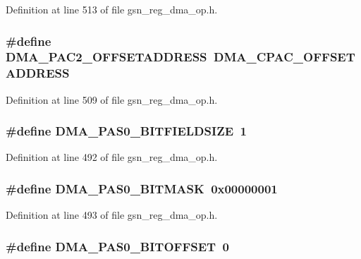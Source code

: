 Definition at line 513 of file gsn\_\-reg\_\-dma\_\-op.h.

\hypertarget{a00547_a59f4ab931db8721c4394452c101c96ca}{
\subsubsection[{DMA\_\-PAC2\_\-OFFSETADDRESS}]{\setlength{\rightskip}{0pt plus 5cm}\#define DMA\_\-PAC2\_\-OFFSETADDRESS~DMA\_\-CPAC\_\-OFFSETADDRESS}}
\label{a00547_a59f4ab931db8721c4394452c101c96ca}


Definition at line 509 of file gsn\_\-reg\_\-dma\_\-op.h.

\hypertarget{a00547_a65408e57bcc7c804db7b0f9af76ea34e}{
\subsubsection[{DMA\_\-PAS0\_\-BITFIELDSIZE}]{\setlength{\rightskip}{0pt plus 5cm}\#define DMA\_\-PAS0\_\-BITFIELDSIZE~1}}
\label{a00547_a65408e57bcc7c804db7b0f9af76ea34e}


Definition at line 492 of file gsn\_\-reg\_\-dma\_\-op.h.

\hypertarget{a00547_a327873e68c74c1b5f34c28543a3bff71}{
\subsubsection[{DMA\_\-PAS0\_\-BITMASK}]{\setlength{\rightskip}{0pt plus 5cm}\#define DMA\_\-PAS0\_\-BITMASK~0x00000001}}
\label{a00547_a327873e68c74c1b5f34c28543a3bff71}


Definition at line 493 of file gsn\_\-reg\_\-dma\_\-op.h.

\hypertarget{a00547_a4f74a5041ded7ccff94284b7ca154911}{
\subsubsection[{DMA\_\-PAS0\_\-BITOFFSET}]{\setlength{\rightskip}{0pt plus 5cm}\#define DMA\_\-PAS0\_\-BITOFFSET~0}}
\label{a00547_a4f74a5041ded7ccff94284b7ca154911}


